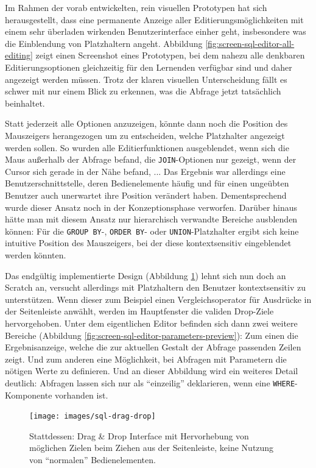 Im Rahmen der vorab entwickelten, rein visuellen Prototypen hat sich herausgestellt, dass eine permanente Anzeige aller Editierungsmöglichkeiten mit einem sehr überladen wirkenden Benutzerinterface einher geht, insbesondere was die Einblendung von Platzhaltern angeht. Abbildung \ref{fig:screen-sql-editor-all-editing} zeigt einen Screenshot eines Prototypen, bei dem nahezu alle denkbaren Editierungsoptionen gleichzeitig für den Lernenden verfügbar sind und daher angezeigt werden müssen. Trotz der klaren visuellen Unterscheidung fällt es schwer mit nur einem Blick zu erkennen, was die Abfrage jetzt tatsächlich beinhaltet.

Statt jederzeit alle Optionen anzuzeigen, könnte dann noch die Position des Mauszeigers herangezogen um zu entscheiden, welche Platzhalter angezeigt werden sollen. So wurden alle Editierfunktionen ausgeblendet, wenn sich die Maus außerhalb der Abfrage befand, die \texttt{JOIN}-Optionen nur gezeigt, wenn der Cursor sich gerade in der Nähe befand, ... Das Ergebnis war allerdings eine Benutzerschnittstelle, deren Bedienelemente häufig und für einen ungeübten Benutzer auch unerwartet ihre Position verändert haben. Dementsprechend wurde dieser Ansatz noch in der Konzeptionsphase verworfen. Darüber hinaus hätte man mit diesem Ansatz nur hierarchisch verwandte Bereiche ausblenden können: Für die \texttt{GROUP BY}-, \texttt{ORDER BY}- oder \texttt{UNION}-Platzhalter ergibt sich keine intuitive Position des Mauszeigers, bei der diese kontextsensitiv eingeblendet werden könnten.

Das endgültig implementierte Design (Abbildung \ref{fig:screen-sql-editor-drag-drop}) lehnt sich nun doch an Scratch an, versucht allerdings mit Platzhaltern den Benutzer kontextsensitiv zu unterstützen. Wenn dieser zum Beispiel einen Vergleichsoperator für Ausdrücke in der Seitenleiste anwählt, werden im Hauptfenster die validen Drop-Ziele hervorgehoben. Unter dem eigentlichen Editor befinden sich dann zwei weitere Bereiche (Abbildung \ref{fig:screen-sql-editor-parameters-preview}): Zum einen die Ergebnisanzeige, welche die zur aktuellen Gestalt der Abfrage passenden Zeilen zeigt. Und zum anderen eine Möglichkeit, bei Abfragen mit Parametern die nötigen Werte zu definieren. Und an dieser Abbildung wird ein weiteres Detail deutlich: Abfragen lassen sich nur als "`einzeilig"' deklarieren, wenn eine \texttt{WHERE}-Komponente vorhanden ist.

\begin{figure}[h]
  \texttt{[image: images/sql-drag-drop]}
  \caption{Stattdessen: Drag \& Drop Interface mit Hervorhebung von möglichen Zielen beim Ziehen aus der Seitenleiste, keine Nutzung von "`normalen"' Bedienelementen.}
  \label{fig:screen-sql-editor-drag-drop}
\end{figure}

